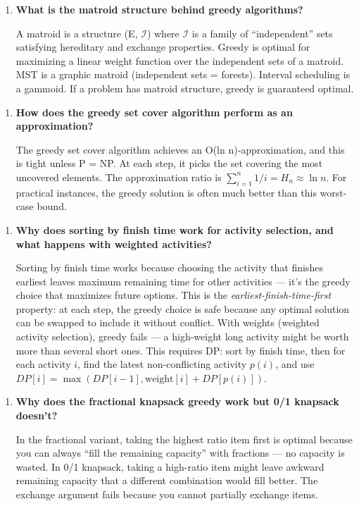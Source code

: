 \begin{enumerate}
\item \textbf{What is the matroid structure behind greedy algorithms?}

A matroid is a structure (E, $\mathcal{I}$) where $\mathcal{I}$ is a family of ``independent'' sets satisfying hereditary and exchange properties. Greedy is optimal for maximizing a linear weight function over the independent sets of a matroid. MST is a graphic matroid (independent sets = forests). Interval scheduling is a gammoid. If a problem has matroid structure, greedy is guaranteed optimal.
\end{enumerate}

\begin{enumerate}
\item \textbf{How does the greedy set cover algorithm perform as an approximation?}

The greedy set cover algorithm achieves an O(ln n)-approximation, and this is tight unless P = NP. At each step, it picks the set covering the most uncovered elements. The approximation ratio is $\sum_{i=1}^{n} 1/i = H_n \approx \ln n$. For practical instances, the greedy solution is often much better than this worst-case bound.
\end{enumerate}

\begin{enumerate}
\item \textbf{Why does sorting by finish time work for activity selection, and what happens with weighted activities?}\label{faq:activity-weighted}

Sorting by finish time works because choosing the activity that finishes earliest leaves maximum remaining time for other activities — it's the greedy choice that maximizes future options. This is the \emph{earliest-finish-time-first} property: at each step, the greedy choice is safe because any optimal solution can be swapped to include it without conflict. With weights (weighted activity selection), greedy fails — a high-weight long activity might be worth more than several short ones. This requires DP: sort by finish time, then for each activity $i$, find the latest non-conflicting activity $p(i)$, and use $DP[i] = \max(DP[i-1], \text{weight}[i] + DP[p(i)])$.
\end{enumerate}

\begin{enumerate}
\item \textbf{Why does the fractional knapsack greedy work but 0/1 knapsack doesn't?}

In the fractional variant, taking the highest ratio item first is optimal because you can always ``fill the remaining capacity'' with fractions — no capacity is wasted. In 0/1 knapsack, taking a high-ratio item might leave awkward remaining capacity that a different combination would fill better. The exchange argument fails because you cannot partially exchange items.
\end{enumerate}

